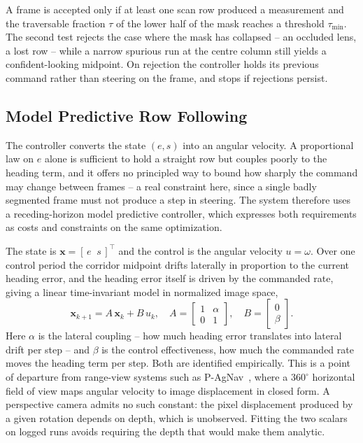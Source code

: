 \documentclass[conference]{IEEEtran}
\begin{document}
A frame is accepted only if at least one scan row produced a measurement and
the traversable fraction $\tau$ of the lower half of the mask reaches a
threshold $\tau_{\min}$. The second test rejects the case where the mask has
collapsed -- an occluded lens, a lost row -- while a narrow spurious run at the
centre column still yields a confident-looking midpoint. On rejection the
controller holds its previous command rather than steering on the frame, and
stops if rejections persist.

\subsection{Model Predictive Row Following}
\label{sec:mpc}
The controller converts the state $(e, s)$ into an angular velocity. A
proportional law on $e$ alone is sufficient to hold a straight row but couples
poorly to the heading term, and it offers no principled way to bound how
sharply the command may change between frames -- a real constraint here, since
a single badly segmented frame must not produce a step in steering. The system
therefore uses a receding-horizon model predictive controller, which expresses
both requirements as costs and constraints on the same optimization.

The state is $\mathbf{x} = [\,e \;\; s\,]^{\!\top}$ and the control is the
angular velocity $u = \omega$. Over one control period the corridor midpoint
drifts laterally in proportion to the current heading error, and the heading
error itself is driven by the commanded rate, giving a linear time-invariant
model in normalized image space,
\begin{equation}
\label{eq:mpc_dynamics}
\mathbf{x}_{k+1} = A\,\mathbf{x}_k + B\,u_k,
\quad
A = \begin{bmatrix} 1 & \alpha \\ 0 & 1 \end{bmatrix},
\quad
B = \begin{bmatrix} 0 \\ \beta \end{bmatrix}.
\end{equation}
Here $\alpha$ is the lateral coupling -- how much heading error translates into
lateral drift per step -- and $\beta$ is the control effectiveness, how much
the commanded rate moves the heading term per step. Both are identified
empirically. This is a point of departure from range-view systems such as
P-AgNav~\cite{kim2025pagnav}, where a $360^\circ$ horizontal field of view maps
angular velocity to image displacement in closed form. A perspective camera
admits no such constant: the pixel displacement produced by a given rotation
depends on depth, which is unobserved. Fitting the two scalars on logged runs
avoids requiring the depth that would make them analytic.
\end{document}

